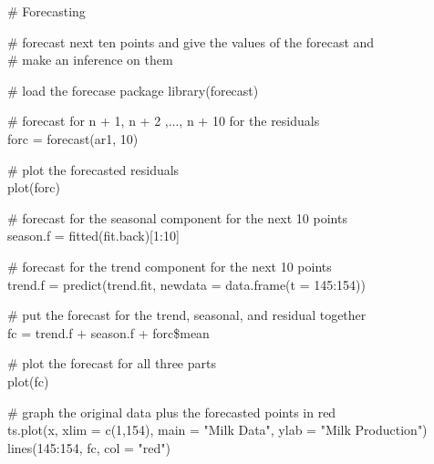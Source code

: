 \documentclass{article}
\begin{document}
\# Forecasting 

\# forecast next ten points and give the values of the forecast and \\
\# make an inference on them 

\# load the forecase package 
library(forecast) 

\# forecast for n + 1, n + 2 ,..., n + 10 for the residuals \\
forc = forecast(ar1, 10)

\# plot the forecasted residuals \\
plot(forc)

\# forecast for the seasonal component for the next 10 points \\
season.f = fitted(fit.back)[1:10]

\# forecast for the trend component for the next 10 points \\
trend.f = predict(trend.fit, newdata = data.frame(t = 145:154))

\# put the forecast for the trend, seasonal, and residual together \\
fc = trend.f + season.f + forc\$mean 

\# plot the forecast for all three parts \\
plot(fc)

\# graph the original data plus the forecasted points in red \\
ts.plot(x, xlim = c(1,154), main = "Milk Data", ylab = "Milk Production")
lines(145:154, fc, col = "red")
\end{document}

